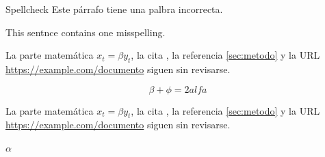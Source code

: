 \documentclass[aspectratio=43]{beamer}
\begin{document}
\begin{frame}{Spellcheck}
Este párrafo tiene una palbra incorrecta.

This sentnce contains one misspelling.

La parte matemática $x_t = \beta y_t$, la cita \cite{smith2020}, la referencia \ref{sec:metodo} y la URL \url{https://example.com/documento} siguen sin revisarse.


\begin{equation}
\beta+\phi=2 alfa
\end{equation}


La parte matemática $x_t = \beta y_t$, la cita \cite{smith2020}, la referencia \ref{sec:metodo} y la URL \url{https://example.com/documento} siguen sin revisarse.



$\alpha$
\end{frame}
\end{document}
